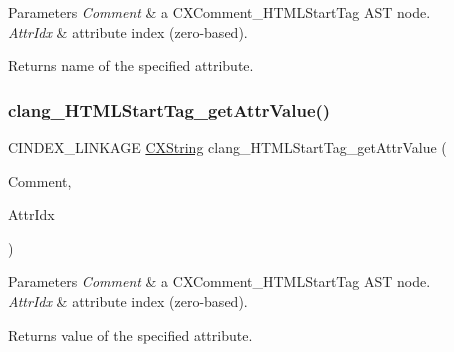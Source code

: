\begin{DoxyParams}{Parameters}
{\em Comment} & a {\ttfamily C\+X\+Comment\+\_\+\+H\+T\+M\+L\+Start\+Tag} A\+ST node.\\
\hline
{\em Attr\+Idx} & attribute index (zero-\/based).\\
\hline
\end{DoxyParams}
\begin{DoxyReturn}{Returns}
name of the specified attribute. 
\end{DoxyReturn}
\mbox{\label{group__CINDEX__COMMENT_gae674a07af38d28d67941c1c54909c5e8}} 
\subsubsection{\texorpdfstring{clang\+\_\+\+H\+T\+M\+L\+Start\+Tag\+\_\+get\+Attr\+Value()}{clang\_HTMLStartTag\_getAttrValue()}}
{\footnotesize\ttfamily C\+I\+N\+D\+E\+X\+\_\+\+L\+I\+N\+K\+A\+GE \mbox{\hyperlink{structCXString}{C\+X\+String}} clang\+\_\+\+H\+T\+M\+L\+Start\+Tag\+\_\+get\+Attr\+Value (\begin{DoxyParamCaption}\item[{\mbox{\hyperlink{structCXComment}{C\+X\+Comment}}}]{Comment,  }\item[{unsigned}]{Attr\+Idx }\end{DoxyParamCaption})}


\begin{DoxyParams}{Parameters}
{\em Comment} & a {\ttfamily C\+X\+Comment\+\_\+\+H\+T\+M\+L\+Start\+Tag} A\+ST node.\\
\hline
{\em Attr\+Idx} & attribute index (zero-\/based).\\
\hline
\end{DoxyParams}
\begin{DoxyReturn}{Returns}
value of the specified attribute. 
\end{DoxyReturn}
\mbox{\label{group__CINDEX__COMMENT_gaffb8098debd5b99c2345840a5f0e63e0}} 
